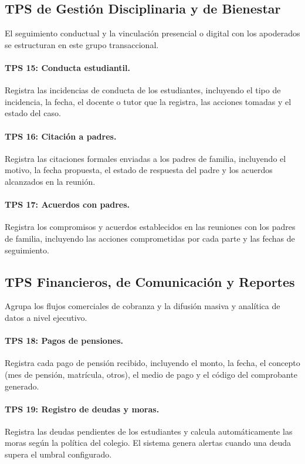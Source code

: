 \documentclass[12pt,a4paper,oneside]{report}
\begin{document}
\subsection{TPS de Gestión Disciplinaria y de Bienestar}
El seguimiento conductual y la vinculación presencial o digital con los apoderados se estructuran en este grupo transaccional.

\paragraph{TPS 15: Conducta estudiantil.} Registra las incidencias de conducta de los estudiantes, incluyendo el tipo de incidencia, la fecha, el docente o tutor que la registra, las acciones tomadas y el estado del caso.

\paragraph{TPS 16: Citación a padres.} Registra las citaciones formales enviadas a los padres de familia, incluyendo el motivo, la fecha propuesta, el estado de respuesta del padre y los acuerdos alcanzados en la reunión.

\paragraph{TPS 17: Acuerdos con padres.} Registra los compromisos y acuerdos establecidos en las reuniones con los padres de familia, incluyendo las acciones comprometidas por cada parte y las fechas de seguimiento.

\subsection{TPS Financieros, de Comunicación y Reportes}
Agrupa los flujos comerciales de cobranza y la difusión masiva y analítica de datos a nivel ejecutivo.

\paragraph{TPS 18: Pagos de pensiones.} Registra cada pago de pensión recibido, incluyendo el monto, la fecha, el concepto (mes de pensión, matrícula, otros), el medio de pago y el código del comprobante generado.

\paragraph{TPS 19: Registro de deudas y moras.} Registra las deudas pendientes de los estudiantes y calcula automáticamente las moras según la política del colegio. El sistema genera alertas cuando una deuda supera el umbral configurado.
\end{document}

